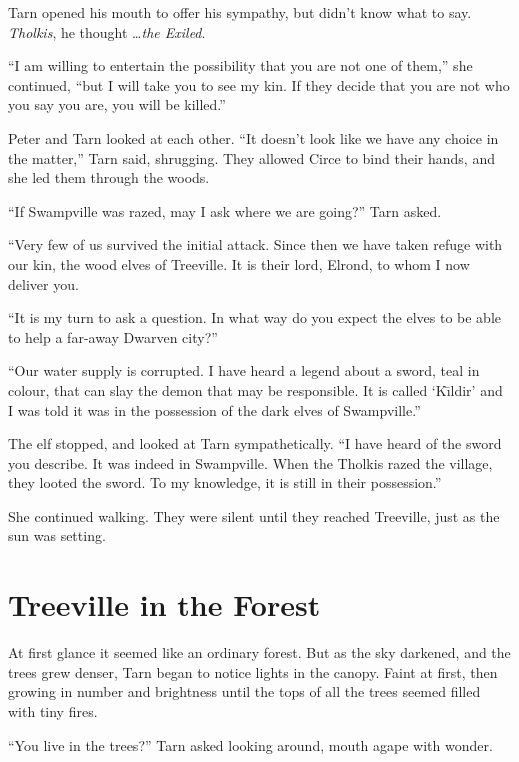 Tarn opened his mouth to offer his sympathy, but didn't know what to say.  \emph{Tholkis}, he thought \ldots \emph{the Exiled}.

``I am willing to entertain the possibility that you are not one of them,'' she continued, ``but I will take you to see my kin.  If they decide that you are not who you say you are, you will be killed.''

Peter and Tarn looked at each other.  ``It doesn't look like we have any choice in the matter,'' Tarn said, shrugging.  They allowed Circe to bind their hands, and she led them through the woods.

``If Swampville was razed, may I ask where we are going?'' Tarn asked.

``Very few of us survived the initial attack.  Since then we have taken refuge with our kin, the wood elves of Treeville.  It is their lord, Elrond, to whom I now deliver you.

``It is my turn to ask a question.  In what way do you expect the elves to be able to help a far-away Dwarven city?''

``Our water supply is corrupted.  I have heard a legend about a sword, teal in colour, that can slay the demon that may be responsible.  It is called `K\=\i{}ldir' and I was told it was in the possession of the dark elves of Swampville.''

The elf stopped, and looked at Tarn sympathetically.  ``I have heard of the sword you describe.  It was indeed in Swampville.  When the Tholkis razed the village, they looted the sword.  To my knowledge, it is still in their possession.''

She continued walking.  They were silent until they reached Treeville, just as the sun was setting.

\chapter{Treeville in the Forest}

At first glance it seemed like an ordinary forest.  But as the sky darkened, and the trees grew denser, Tarn began to notice lights in the canopy.  Faint at first, then growing in number and brightness until the tops of all the trees seemed filled with tiny fires.

``You live in the trees?'' Tarn asked looking around, mouth agape with wonder.

